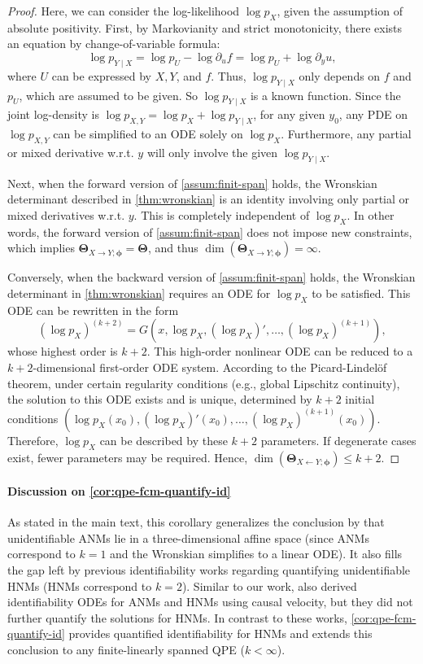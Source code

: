 \documentclass{article}
\theoremstyle{plain}
\theoremstyle{definition}
\theoremstyle{remark}
\begin{document}
\begin{proof}
Here, we can consider the log-likelihood $\log p_X$, given the assumption of absolute positivity. First, by Markovianity and strict monotonicity, there exists an equation by change-of-variable formula:
\[
\log p_{Y\mid X}=\log p_U-\log\partial_uf=\log p_U+\log\partial_y u,
\]
where $U$ can be expressed by $X,Y$, and $f$. Thus, $\log p_{Y\mid X}$ only depends on $f$ and $p_U$, which are assumed to be given. So $\log p_{Y\mid X}$ is a known function. Since the joint log-density is $\log p_{X,Y}=\log p_{X}+\log p_{Y\mid X}$, for any given $y_0$, any PDE on $\log p_{X,Y}$ can be simplified to an ODE solely on $\log p_{X}$. Furthermore, any partial or mixed derivative w.r.t. $y$ will only involve the given $\log p_{Y\mid X}$.

Next, when the forward version of \cref{assum:finit-span} holds, the Wronskian determinant described in \cref{thm:wronskian} is an identity involving only partial or mixed derivatives w.r.t. $y$. This is completely independent of $\log p_{X}$. In other words, the forward version of \cref{assum:finit-span} does not impose new constraints, which implies $\mathbf{\Theta}_{X\to Y;\bm{\phi}}=\mathbf{\Theta}$, and thus $\dim(\mathbf{\Theta}_{X\to Y;\bm{\phi}})=\infty$.

Conversely, when the backward version of \cref{assum:finit-span} holds, the Wronskian determinant in \cref{thm:wronskian} requires an ODE for $\log p_{X}$ to be satisfied. This ODE can be rewritten in the form
\[
(\log p_X)^{(k+2)}=G(x,\log p_X,(\log p_X)',\dots,(\log p_X)^{(k+1)}),
\]
whose highest order is $k+2$. This high-order nonlinear ODE can be reduced to a $k+2$-dimensional first-order ODE system. According to the Picard-Lindelöf theorem, under certain regularity conditions (e.g., global Lipschitz continuity), the solution to this ODE exists and is unique, determined by $k+2$ initial conditions $(\log p_X(x_0),(\log p_X)'(x_0),\dots,(\log p_X)^{(k+1)}(x_0))$. Therefore, $\log p_X$ can be described by these $k+2$ parameters. If degenerate cases exist, fewer parameters may be required. Hence, $\dim(\mathbf{\Theta}_{X\gets Y;\bm{\phi}})\le k+2$.
\end{proof}

\paragraph{Discussion on \cref{cor:qpe-fcm-quantify-id}} As stated in the main text, this corollary generalizes the conclusion by \citep{Hoyer2008} that unidentifiable ANMs lie in a three-dimensional affine space (since ANMs correspond to $k=1$ and the Wronskian simplifies to a linear ODE). It also fills the gap left by previous identifiability works \citep{Immer2023, Strobl2023} regarding quantifying unidentifiable HNMs (HNMs correspond to $k=2$). Similar to our work, \citet{Xi2025} also derived identifiability ODEs for ANMs and HNMs using causal velocity, but they did not further quantify the solutions for HNMs. In contrast to these works, \cref{cor:qpe-fcm-quantify-id} provides quantified identifiability for HNMs and extends this conclusion to any finite-linearly spanned QPE ($k<\infty$).%
\end{document}
